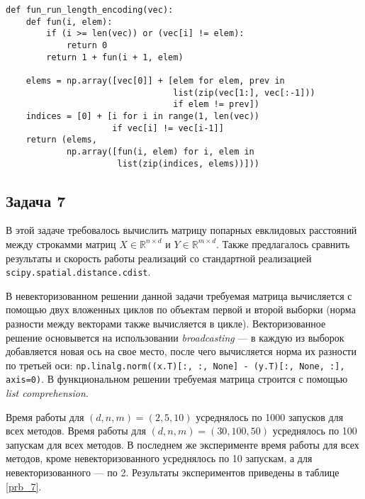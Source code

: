 \documentclass[12pt]{article}
\begin{document}
	\pagebreak
	\begin{lstlisting}[frame = lines, caption={Функциональное решение задачи 6}, label=lst_fun_6]
def fun_run_length_encoding(vec):
    def fun(i, elem):
        if (i >= len(vec)) or (vec[i] != elem):
            return 0
        return 1 + fun(i + 1, elem)

    elems = np.array([vec[0]] + [elem for elem, prev in
                                 list(zip(vec[1:], vec[:-1])) 
                                 if elem != prev])
    indices = [0] + [i for i in range(1, len(vec))
                     if vec[i] != vec[i-1]]
    return (elems,
            np.array([fun(i, elem) for i, elem in 
                      list(zip(indices, elems))]))
	\end{lstlisting}
	

\subsection{Задача 7}

\hspace{0.5cm}В этой задаче требовалось вычислить матрицу попарных евклидовых расстояний между строкамми матриц $X \in \mathbb{R}^{n\times d}$ и $Y \in \mathbb{R}^{m\times d}$. Также предлагалось сравнить результаты и скорость работы реализаций со стандартной реализацией \\ \lstinline$scipy.spatial.distance.cdist$.

В невекторизованном решении данной задачи требуемая матрица вычисляется с помощью двух вложенных циклов по объектам первой и второй выборки (норма разности между векторами также вычисляется в цикле). Векторизованное решение основывется на использовании {\it broadcasting} — в каждую из выборок добавляется новая ось на свое место, после чего вычисляется норма их разности по третьей оси: \lstinline$np.linalg.norm((x.T)[:, :, None] - (y.T)[:, None, :], axis=0)$. В функциональном решении требуемая матрица строится с помощью {\it list comprehension}.

Время работы для $(d, n, m) = (2, 5, 10)$ усреднялось по 1000 запусков для всех методов. Время работы для $(d, n, m) = (30, 100, 50)$ усреднялось по 100 запускам для всех методов. В последнем же эксперименте время работы для всех методов, кроме невекторизованного усреднялось по 10 запускам, а для невекторизованного — по 2. Результаты экспериментов приведены в таблице \ref{prb_7}.
\end{document}
